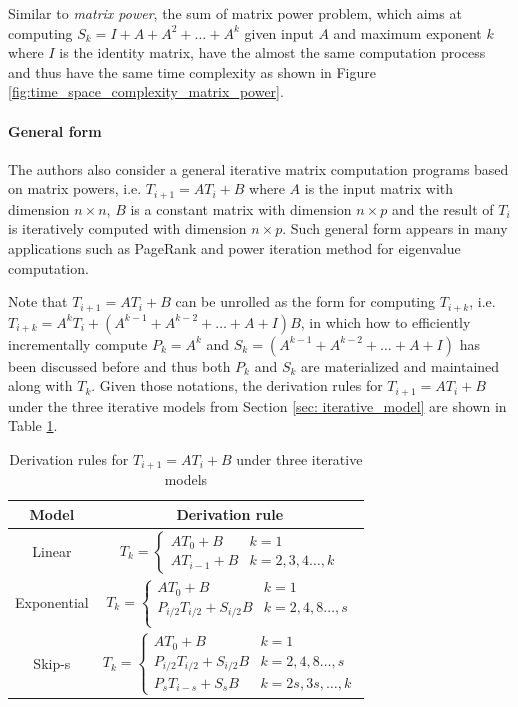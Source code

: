 Similar to {\em matrix power}, the sum of matrix power problem, which aims at computing $S_k = I + A + A^2 + \dots + A^k$ given input $A$ and maximum exponent $k$ where $I$ is the identity matrix, have the almost the same computation process and thus have the same time complexity as shown in Figure \ref{fig:time_space_complexity_matrix_power}. 

\paragraph{General form} The authors also consider a general iterative matrix computation programs based on matrix powers, i.e. $T_{i+1} = AT_{i} + B$ where $A$ is the input matrix with dimension $n \times n$, $B$ is a constant matrix with dimension $n \times p$ and the result of $T_{i}$ is iteratively computed with dimension $n \times p$. Such general form appears in many applications such as PageRank and power iteration method for eigenvalue computation. 

Note that $T_{i+1} = AT_{i} + B$ can be unrolled as the form for computing $T_{i+k}$, i.e. $T_{i+k} = A^kT_{i} + (A^{k-1} + A^{k-2} + \dots + A + I) B$, in which how to efficiently incrementally compute $P_k = A^k$ and $S_k = (A^{k-1} + A^{k-2} + \dots + A + I)$ has been discussed before and thus both $P_k$ and $S_k$ are materialized and maintained along with $T_k$. Given those notations, the derivation rules for $T_{i+1} = AT_{i} + B$ under the three iterative models from Section \ref{sec: iterative_model} are shown in Table \ref{tab:derivation_rule}.

\begin{table}[]
    \centering
    \begin{tabular}{|c|c|}\hline
        Model & Derivation rule \\ \hline
        Linear & $T_k=
\begin{cases}
AT_0 + B& k=1\\
AT_{i-1} + B & k=2,3,4\dots,k
\end{cases}$\\ \hline
        Exponential & $T_k=
\begin{cases}
AT_0 + B& k=1\\
P_{i/2}T_{i/2} + S_{i/2}B & k=2,4,8\dots,s\\
\end{cases}$\\ \hline
        Skip-s &$T_k=
\begin{cases}
AT_0 + B& k=1\\
P_{i/2}T_{i/2} + S_{i/2}B & k=2,4,8\dots,s\\
P_sT_{i-s} + S_sB & k = 2s, 3s, \dots, k
\end{cases}$\\ \hline
    \end{tabular}
    \caption{Derivation rules for $T_{i+1} = AT_{i} + B$ under three iterative models}
    \label{tab:derivation_rule}
\end{table}

